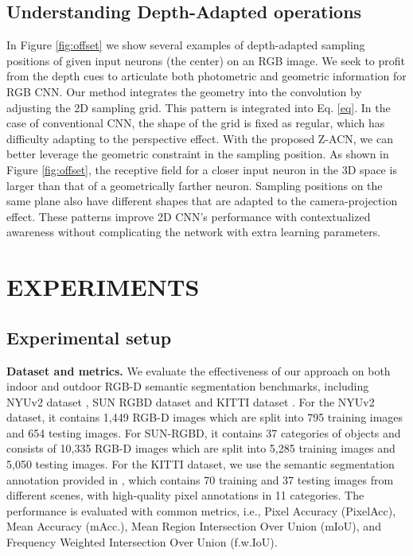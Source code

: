 \documentclass[lettersize,journal]{IEEEtran}
\begin{document}
\subsection{Understanding Depth-Adapted operations}

In Figure \ref{fig:offset} we show several examples of depth-adapted sampling positions of given input neurons (the center) on an RGB image. We seek to profit from the depth cues to articulate both photometric and geometric information for RGB CNN. Our method integrates the geometry into the convolution by adjusting the 2D sampling grid. This pattern is integrated into Eq. \ref{eq}. In the case of conventional CNN, the shape of the grid is fixed as regular, which has difficulty adapting to the perspective effect. With the proposed Z-ACN, we can better leverage the geometric constraint in the sampling position. As shown in Figure \ref{fig:offset}, the receptive field for a closer input neuron in the 3D space is larger than that of a geometrically farther neuron. Sampling positions on the same plane also have different shapes that are adapted to the camera-projection effect. These patterns improve 2D CNN's performance with contextualized awareness without complicating the network with extra learning parameters.


\section{EXPERIMENTS}
\subsection{Experimental setup}
\label{sec:setup}

\textbf{Dataset and metrics.} We evaluate the effectiveness of our approach on both indoor and outdoor RGB-D semantic segmentation benchmarks, including NYUv2 dataset \cite{silberman2012NYUV2}, SUN RGBD dataset \cite{song2015sun} and KITTI dataset \cite{kitti}. For the NYUv2 dataset, it contains 1,449 RGB-D images which are split into 795 training images and 654 testing images. For SUN-RGBD, it contains 37 categories of objects and consists of 10,335 RGB-D images which are split into 5,285 training images and 5,050 testing images. For the KITTI dataset, we use the semantic segmentation annotation provided in \cite{xu:kitti}, which contains 70 training and 37 testing images from different scenes, with high-quality pixel annotations in 11 categories. The performance is evaluated with common metrics, i.e., Pixel Accuracy (PixelAcc), Mean Accuracy (mAcc.), Mean Region Intersection Over Union (mIoU), and Frequency Weighted Intersection Over Union (f.w.IoU).
\end{document}
